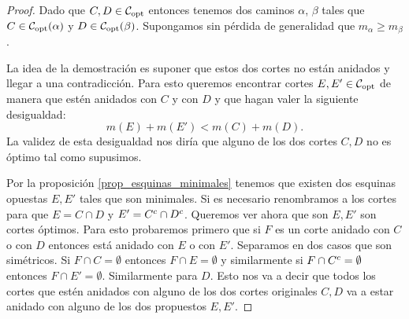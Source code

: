 \documentclass[tesis.tex]{subfiles}
\begin{document}
\begin{proof}
	Dado que $C, D \in {\cal C}_{\text{opt}}$ entonces tenemos dos caminos $\alpha$, $\beta$ tales que $C \in {\cal C}_{\text{opt}}(\alpha)$ y $D \in {\cal C}_{\text{opt}}(\beta)$.
	Supongamos sin pérdida de generalidad que $m_{\alpha} \ge m_{\beta}$.
	
	La idea de la demostración es suponer que estos dos cortes no están anidados y llegar a una contradicción.
	Para esto queremos encontrar cortes $E, E' \in {\cal C}_{\text{opt}}$ de manera que estén anidados con $C$ y con $D$ y que hagan valer la siguiente desigualdad:
	\[
	m(E) + m(E') < m(C) + m(D).
	\]   
	La validez de esta desigualdad nos diría que alguno de los dos cortes $C,D$ no es óptimo tal como supusimos.
	
	Por la proposición \ref{prop_esquinas_minimales} tenemos que existen dos esquinas opuestas $ E, E' $ tales que son minimales.	
	Si es necesario renombramos a los cortes para que $E = C \cap D$ y $E' = C^{c} \cap D^{c}$.
	Queremos ver ahora que son $E,E'$ son cortes óptimos.	
	Para esto probaremos primero que si $F$ es un corte anidado con $C$ o con $D$ entonces está anidado con $E$ o con $E'$.
	Separamos en dos casos que son simétricos.
	Si $F \cap C = \emptyset$ entonces $F \cap E= \emptyset$ y similarmente si $F \cap C^{c} = \emptyset$ entonces $F \cap E' = \emptyset$.
	Similarmente para $D$.
	Esto nos va a decir que todos los cortes que estén anidados con alguno de los dos cortes originales $C,D$ va a estar anidado con alguno de los dos propuestos $E,E'$.
	

\end{proof}
\end{document}
